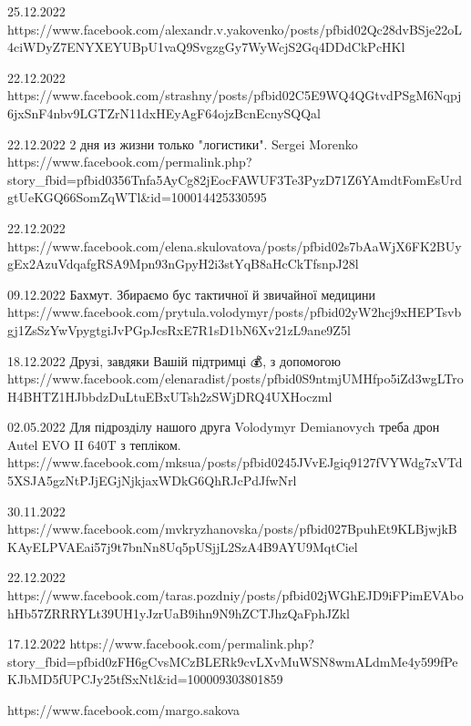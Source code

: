 25.12.2022
https://www.facebook.com/alexandr.v.yakovenko/posts/pfbid02Qc28dvBSje22oL4ciWDyZ7ENYXEYUBpU1vaQ9SvgzgGy7WyWcjS2Gq4DDdCkPcHKl

22.12.2022
https://www.facebook.com/strashny/posts/pfbid02C5E9WQ4QGtvdPSgM6Nqpj6jxSnF4nbv9LGTZrN11dxHEyAgF64ojzBcnEcnySQQal

22.12.2022
2 дня из жизни только "логистики".
Sergei Morenko
https://www.facebook.com/permalink.php?story_fbid=pfbid0356Tnfa5AyCg82jEocFAWUF3Te3PyzD71Z6YAmdtFomEsUrdgtUeKGQ66SomZqWTl&id=100014425330595

22.12.2022
https://www.facebook.com/elena.skulovatova/posts/pfbid02s7bAaWjX6FK2BUygEx2AzuVdqafgRSA9Mpn93nGpyH2i3stYqB8aHcCkTfsnpJ28l

09.12.2022
Бахмут. Збираємо бус тактичної й звичайної медицини
https://www.facebook.com/prytula.volodymyr/posts/pfbid02yW2hcj9xHEPTsvbgj1ZsSzYwVpygtgiJvPGpJcsRxE7R1sD1bN6Xv21zL9ane9Z5l

18.12.2022
Друзі, завдяки Вашій підтримці 💰, з  допомогою
https://www.facebook.com/elenaradist/posts/pfbid0S9ntmjUMHfpo5iZd3wgLTroH4BHTZ1HJbbdzDuLtuEBxUTsh2zSWjDRQ4UXHoczml

02.05.2022
Для підрозділу нашого друга Volodymyr Demianovych треба дрон Autel EVO II 640T з тепліком.
https://www.facebook.com/mksua/posts/pfbid0245JVvEJgiq9127fVYWdg7xVTd5XSJA5gzNtPJjEGjNjkjaxWDkG6QhRJcPdJfwNrl

30.11.2022
https://www.facebook.com/mvkryzhanovska/posts/pfbid027BpuhEt9KLBjwjkBKAyELPVAEai57j9t7bnNn8Uq5pUSjjL2SzA4B9AYU9MqtCiel

22.12.2022
https://www.facebook.com/taras.pozdniy/posts/pfbid02jWGhEJD9iFPimEVAbohHb57ZRRRYLt39UH1yJzrUaB9ihn9N9hZCTJhzQaFphJZkl

17.12.2022
https://www.facebook.com/permalink.php?story_fbid=pfbid0zFH6gCvsMCzBLERk9cvLXvMuWSN8wmALdmMe4y599fPeKJbMD5fUPCJy25tfSxNtl&id=100009303801859

https://www.facebook.com/margo.sakova
